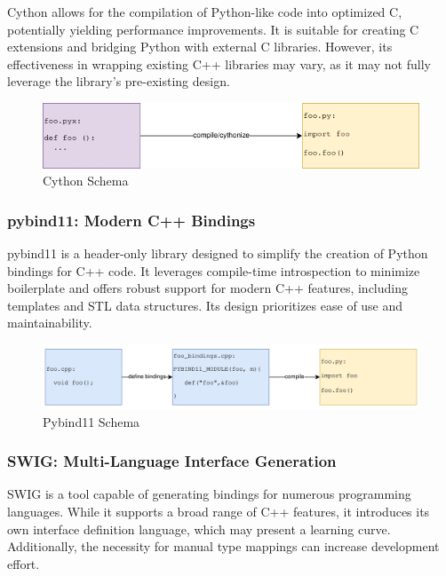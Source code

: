 Cython allows for the compilation of Python-like code into optimized C, potentially yielding performance improvements. It is suitable for creating C extensions and bridging Python with external C libraries. However, its effectiveness in wrapping existing C++ libraries may vary, as it may not fully leverage the library's pre-existing design. \cite{cython-docu}

\begin{figure}[htpb]
    \centering
    \includegraphics[width=\textwidth]{figures/cython_schema.png}
    \caption{Cython Schema}
    \label{fig:cython-schema}
\end{figure}

\subsubsection{pybind11: Modern C++ Bindings}

pybind11 is a header-only library designed to simplify the creation of Python bindings for C++ code. It leverages compile-time introspection to minimize boilerplate and offers robust support for modern C++ features, including templates and \ac{STL} data structures. Its design prioritizes ease of use and maintainability. \cite {pybind11-docu}

\begin{figure}[htpb]
    \centering
    \includegraphics[scale=0.5]{figures/pybind_schema.png}
    \caption{Pybind11 Schema}
    \label{fig:pybind11-schema}
\end{figure}

\subsubsection{SWIG: Multi-Language Interface Generation}

SWIG is a tool capable of generating bindings for numerous programming languages. While it supports a broad range of C++ features, it introduces its own interface definition language, which may present a learning curve. Additionally, the necessity for manual type mappings can increase development effort. \cite{swig-docu}

